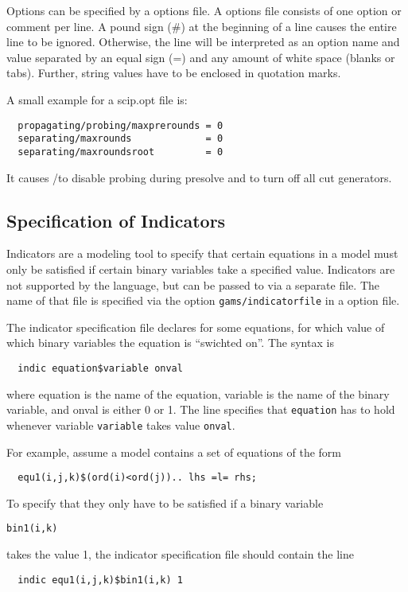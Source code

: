 Options can be specified by a \SCIP options file.
A \SCIP options file consists of one option or comment per line.
A pound sign (\#) at the beginning of a line causes the entire line to be ignored.
Otherwise, the line will be interpreted as an option name and value separated by an equal sign (=) and any amount of white space (blanks or tabs).
Further, string values have to be enclosed in quotation marks.

A small example for a scip.opt file is:
\begin{verbatim}
  propagating/probing/maxprerounds = 0
  separating/maxrounds             = 0
  separating/maxroundsroot         = 0
\end{verbatim}
It causes \GAMS/\SCIP to disable probing during presolve and to turn off all cut generators.

\subsection{Specification of Indicators}

Indicators are a modeling tool to specify that certain equations in a model must only be satisfied if certain binary variables take a specified value.
Indicators are not supported by the \GAMS language, but can be passed to \SCIP via a separate file.
The name of that file is specified via the option \texttt{gams/indicatorfile} in a \SCIP option file.

The indicator specification file declares for some equations, for which value of which binary variables the equation is ``swichted on''. The syntax is
\begin{verbatim}
  indic equation$variable onval
\end{verbatim}
where equation is the name of the equation, variable is the name of the binary variable, and onval is either 0 or 1.
The line specifies that \texttt{equation} has to hold whenever variable \texttt{variable} takes value \texttt{onval}.

For example, assume a \GAMS model contains a set of equations of the form
\begin{verbatim}
  equ1(i,j,k)$(ord(i)<ord(j)).. lhs =l= rhs;
\end{verbatim}
To specify that they only have to be satisfied if a binary variable
\begin{verbatim}
bin1(i,k)
\end{verbatim}
takes the value 1, the indicator specification file should contain the line
\begin{verbatim}
  indic equ1(i,j,k)$bin1(i,k) 1
\end{verbatim}

